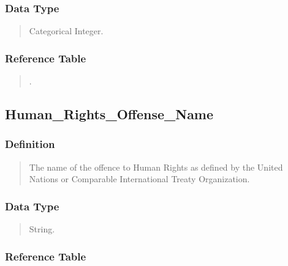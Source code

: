\documentclass[letterpaper,10pt,english]{sphinxmanual}
\begin{document}
\subsubsection{Data Type}
\label{\detokenize{schema_tables:id74}}\begin{quote}

\sphinxAtStartPar
Categorical Integer.
\end{quote}


\subsubsection{Reference Table}
\label{\detokenize{schema_tables:id75}}\begin{quote}

\sphinxAtStartPar
{\hyperref[\detokenize{schema_tables:human-rights-offense-table}]{}}.
\end{quote}


\subsection{Human\_Rights\_Offense\_Name}
\label{\detokenize{schema_tables:human-rights-offense-name}}

\subsubsection{Definition}
\label{\detokenize{schema_tables:id76}}\begin{quote}

\sphinxAtStartPar
The name of the offence to Human Rights as defined by the United Nations or Comparable International Treaty Organization.
\end{quote}


\subsubsection{Data Type}
\label{\detokenize{schema_tables:id77}}\begin{quote}

\sphinxAtStartPar
String.
\end{quote}


\subsubsection{Reference Table}
\label{\detokenize{schema_tables:id78}}\begin{quote}

\sphinxAtStartPar
{\hyperref[\detokenize{schema_tables:human-rights-offense-table}]{}}
\end{quote}
\end{document}
